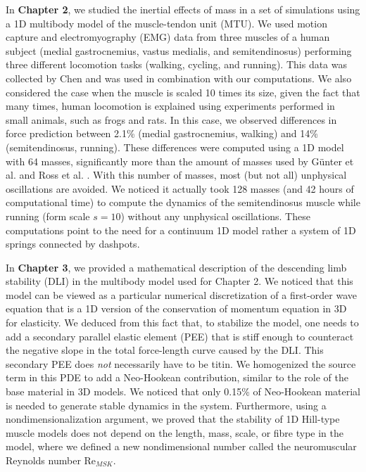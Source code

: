 \documentclass{sfuthesis}
\numberwithin{equation}{section}
\numberwithin{figure}{chapter}
\numberwithin{table}{chapter}
\theoremstyle{definition}
\begin{document}
In \textbf{Chapter 2}, we studied the inertial effects of mass in a set of simulations using a 1D multibody model of the muscle-tendon unit (MTU). We used motion capture and electromyography (EMG) data from three muscles of a human subject (medial gastrocnemius, vastus medialis, and semitendinosus) performing three different locomotion tasks (walking, cycling, and running). This data was collected by Chen \cite{EvanThesis} and was used in combination with our computations. 
We also considered the case when the muscle is scaled 10 times its size, given the fact that many times, human locomotion is explained using experiments performed in small animals, such as frogs and rats. In this case, we observed differences in force prediction between 2.1\% (medial gastrocnemius, walking) and 14\% (semitendinosus, running). These differences were computed using a 1D model with 64 masses, significantly more than the amount of masses used by G\"{u}nter et al. \cite{Gunther2012} and Ross et al. \cite{Ross2018-1D}. With this number of masses, most (but not all) unphysical oscillations are avoided. We noticed it actually took 128 masses (and 42 hours of computational time) to compute the dynamics of the semitendinosus muscle while running (form scale $s=10$) without any unphysical oscillations. These computations point to the need for a continuum 1D model rather a system of 1D springs connected by dashpots.

In \textbf{Chapter 3}, we provided a mathematical description of the descending limb stability (DLI) in the multibody model used for Chapter 2. We noticed that this model can be viewed as a particular numerical discretization of a first-order wave equation that is a 1D version of the conservation of momentum equation in 3D for elasticity. We deduced from this fact that, to stabilize the model, one needs to add a secondary parallel elastic element (PEE) that is stiff enough to counteract the negative slope in the total force-length curve caused by the DLI. This secondary PEE does \textit{not} necessarily have to be titin. 
We homogenized the source term in this PDE to add a Neo-Hookean contribution, similar to the role of the base material in 3D models. We noticed that only 0.15\% of Neo-Hookean material is needed to generate stable dynamics in the system. Furthermore, using a nondimensionalization argument, we proved that the stability of 1D Hill-type muscle models does not depend on the length, mass, scale, or fibre type in the model, where we defined a new nondimensional number called the neuromuscular Reynolds number $\mathrm{Re}_{MSK}$.
\end{document}
